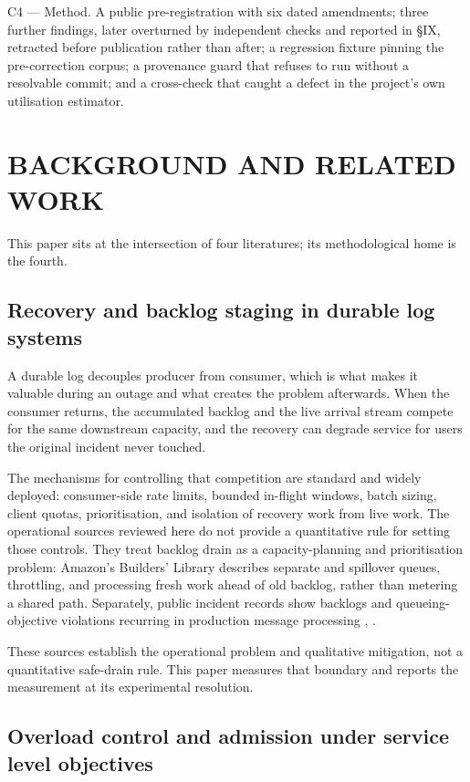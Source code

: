 \documentclass{ieeeaccess}
\begin{document}
C4 --- Method. A public pre-registration with six dated amendments; three further findings, later overturned by independent checks and reported in \S{}IX, retracted before publication rather than after; a regression fixture pinning the pre-correction corpus; a provenance guard that refuses to run without a resolvable commit; and a cross-check that caught a defect in the project's own utilisation estimator.

\section{BACKGROUND AND RELATED WORK}

This paper sits at the intersection of four literatures; its methodological home is the fourth.

\subsection{Recovery and backlog staging in durable log systems}

A durable log decouples producer from consumer, which is what makes it valuable during an outage and what creates the problem afterwards. When the consumer returns, the accumulated backlog and the live arrival stream compete for the same downstream capacity, and the recovery can degrade service for users the original incident never touched.

The mechanisms for controlling that competition are standard and widely deployed: consumer-side rate limits, bounded in-flight windows, batch sizing, client quotas, prioritisation, and isolation of recovery work from live work. The operational sources reviewed here do not provide a quantitative rule for setting those controls. They treat backlog drain as a capacity-planning and prioritisation problem: Amazon's Builders' Library \cite{yanacek} describes separate and spillover queues, throttling, and processing fresh work ahead of old backlog, rather than metering a shared path. Separately, public incident records show backlogs and queueing-objective violations recurring in production message processing \cite{gitlab-20797}, \cite{gitlab-21046}.

These sources establish the operational problem and qualitative mitigation, not a quantitative safe-drain rule. This paper measures that boundary and reports the measurement at its experimental resolution.

\subsection{Overload control and admission under service level objectives}
\end{document}
